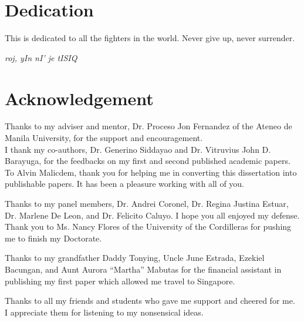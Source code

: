 \documentclass[12pt]{report}			%
\begin{document}
\ifnotAbstractOnly

\chapter*{Dedication}

This is dedicated to all the fighters in the world. Never give up, never surrender.

\begin{flushright}
\textit{roj, yIn nI' je tISIQ}
\end{flushright}


\chapter*{Acknowledgement}


Thanks to my adviser and mentor, Dr. Proceso Jon Fernandez of the Ateneo de Manila University, for the support and encouragement. \ifnotUCFormat \\ 

\fi I thank my co-authors, Dr. Generino Siddayao and Dr. Vitruvius John D. Barayuga, for the feedbacks on my first and second published academic papers. To Alvin Malicdem, thank you for helping me in converting this dissertation into publishable papers. It has been a pleasure working with all of you. \ifnotUCFormat \\ \fi

Thanks to my panel members, Dr. Andrei Coronel, Dr. Regina Justina Estuar, Dr. Marlene De Leon, and Dr. Felicito Caluyo. I hope you all enjoyed my defense. \ifnotUCFormat \\ \fi Thank you to Ms. Nancy Flores of the University of the Cordilleras for pushing me to finish my Doctorate. \ifnotUCFormat \\ \fi

Thanks to my grandfather Daddy Tonying, Uncle June Estrada, Ezekiel Bacungan, and Aunt Aurora \enquote{Martha} Mabutas for the financial assistant in publishing my first paper which allowed me travel to Singapore. \ifnotUCFormat \\ \fi

Thanks to all my friends and students who gave me support and cheered for me. I appreciate them for listening to my nonsensical ideas. \ifnotUCFormat \\ \fi
\end{document}
